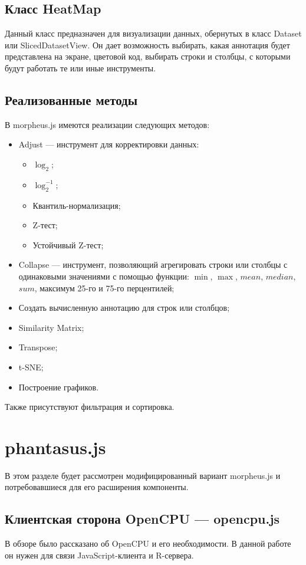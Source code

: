 \documentclass[annotation,specification]{itmo-student-thesis}
\begin{document}
\subsection{Класс HeatMap}
Данный класс предназначен для визуализации данных, обернутых в класс Dataset или SlicedDatasetView. Он дает возможность выбирать, какая аннотация будет представлена на экране, цветовой код, выбирать строки и столбцы, с которыми будут работать те или иные инструменты.

\subsection{Реализованные методы}
В morpheus.js имеются реализации следующих методов:

\begin{itemize}
\item Adjust --- инструмент для корректировки данных:\begin{itemize}
    \item $\log_{2}$;
    \item $\log_{2}^{-1}$;
    \item Квантиль-нормализация;
    \item Z-тест;
    \item Устойчивый Z-тест;\end{itemize}
\item Collapse --- инструмент, позволяющий агрегировать строки или столбцы с одинаковыми значениями с помощью функции: $\min$, $\max$, $mean$, $median$, $sum$, максимум 25-го и 75-го перцентилей;
\item Создать вычисленную аннотацию для строк или столбцов;
\item Similarity Matrix;
\item Transpose;
\item t-SNE;
\item Построение графиков.
\end{itemize}

Также присутствуют фильтрация и сортировка. 

\section{phantasus.js}
В этом разделе будет рассмотрен модифицированный вариант morpheus.js и потребовавшиеся для его расширения компоненты.
\subsection{Клиентская сторона OpenCPU --- opencpu.js}
В обзоре было рассказано об OpenCPU и его необходимости. В данной работе он нужен для связи JavaScript-клиента и R-сервера.
\end{document}
